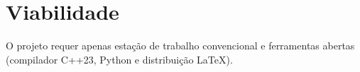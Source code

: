 \documentclass{amsart}
\begin{document}
\section{Viabilidade}
O projeto requer apenas estação de trabalho convencional e ferramentas abertas (compilador C++23, Python e distribuição LaTeX).

\newpage


\end{document}
